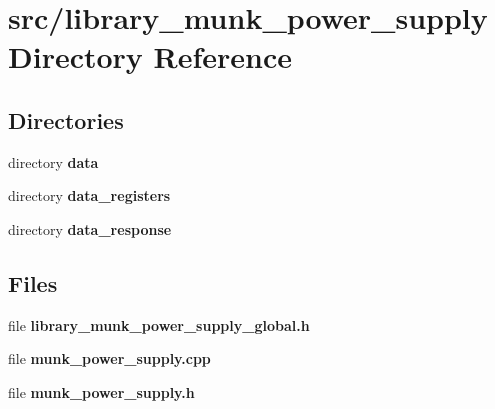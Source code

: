 \section{src/library\+\_\+munk\+\_\+power\+\_\+supply Directory Reference}
\label{dir_c2d2a64bc8544dac5bf3c30476a39f26}
\subsection*{Directories}
\begin{DoxyCompactItemize}
\item 
directory \textbf{ data}
\item 
directory \textbf{ data\+\_\+registers}
\item 
directory \textbf{ data\+\_\+response}
\end{DoxyCompactItemize}
\subsection*{Files}
\begin{DoxyCompactItemize}
\item 
file \textbf{ library\+\_\+munk\+\_\+power\+\_\+supply\+\_\+global.\+h}
\item 
file \textbf{ munk\+\_\+power\+\_\+supply.\+cpp}
\item 
file \textbf{ munk\+\_\+power\+\_\+supply.\+h}
\end{DoxyCompactItemize}
